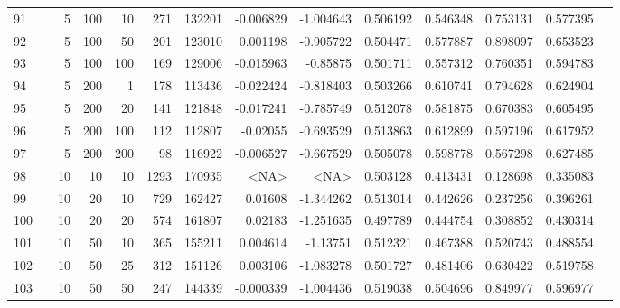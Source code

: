 \begin{longtable}{llrrrrrrrrrrrr}
		91  & &            5 &               100 &           10 &         271 &     132201 & -0.006829 & -1.004643 &  0.506192 &    0.546348 &       0.753131 &  0.577395 \\
		92  & &            5 &               100 &           50 &         201 &     123010 &  0.001198 & -0.905722 &  0.504471 &    0.577887 &       0.898097 &  0.653523 \\
		93  & &            5 &               100 &          100 &         169 &     129006 & -0.015963 &  -0.85875 &  0.501711 &    0.557312 &       0.760351 &  0.594783 \\
		94  & &            5 &               200 &            1 &         178 &     113436 & -0.022424 & -0.818403 &  0.503266 &    0.610741 &       0.794628 &  0.624904 \\
		95  & &            5 &               200 &           20 &         141 &     121848 & -0.017241 & -0.785749 &  0.512078 &    0.581875 &       0.670383 &  0.605495 \\
		96  & &            5 &               200 &          100 &         112 &     112807 &  -0.02055 & -0.693529 &  0.513863 &    0.612899 &       0.597196 &  0.617952 \\
		97  & &            5 &               200 &          200 &          98 &     116922 & -0.006527 & -0.667529 &  0.505078 &    0.598778 &       0.567298 &  0.627485 \\
		98  & &           10 &                10 &           10 &           1293 &     170935 &      <NA> &      <NA> &  0.503128 &    0.413431 &       0.128698 &  0.335083 \\
		99  & &           10 &                20 &           10 &         729 &     162427 &   0.01608 & -1.344262 &  0.513014 &    0.442626 &       0.237256 &  0.396261 \\
		100 & &           10 &                20 &           20 &         574 &     161807 &   0.02183 & -1.251635 &  0.497789 &    0.444754 &       0.308852 &  0.430314 \\
		101 & &           10 &                50 &           10 &         365 &     155211 &  0.004614 &  -1.13751 &  0.512321 &    0.467388 &       0.520743 &  0.488554 \\
		102 & &           10 &                50 &           25 &         312 &     151126 &  0.003106 & -1.083278 &  0.501727 &    0.481406 &       0.630422 &  0.519758 \\
		103 & &           10 &                50 &           50 &         247 &     144339 & -0.000339 & -1.004436 &  0.519038 &    0.504696 &       0.849977 &  0.596977 \\

\end{longtable}
